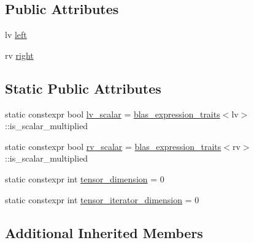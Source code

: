 \subsection*{Public Attributes}
\begin{DoxyCompactItemize}
\item 
lv \hyperlink{structBC_1_1tensors_1_1exprs_1_1Binary__Expression_3_01oper_1_1dot_3_01System__Tag_01_4_00_01lv_00_01rv_01_4_a17d0cd14365a29c0aa10cba3f9d57c04}{left}
\item 
rv \hyperlink{structBC_1_1tensors_1_1exprs_1_1Binary__Expression_3_01oper_1_1dot_3_01System__Tag_01_4_00_01lv_00_01rv_01_4_ac16bea75afa747671af04ba484694a19}{right}
\end{DoxyCompactItemize}
\subsection*{Static Public Attributes}
\begin{DoxyCompactItemize}
\item 
static constexpr bool \hyperlink{structBC_1_1tensors_1_1exprs_1_1Binary__Expression_3_01oper_1_1dot_3_01System__Tag_01_4_00_01lv_00_01rv_01_4_a49e4e40c1204f61b32a0806f9610c91d}{lv\+\_\+scalar} = \hyperlink{structBC_1_1tensors_1_1exprs_1_1blas__expression__traits}{blas\+\_\+expression\+\_\+traits}$<$lv$>$\+::is\+\_\+scalar\+\_\+multiplied
\item 
static constexpr bool \hyperlink{structBC_1_1tensors_1_1exprs_1_1Binary__Expression_3_01oper_1_1dot_3_01System__Tag_01_4_00_01lv_00_01rv_01_4_ad88437990f342c0a97fbe05153f23af1}{rv\+\_\+scalar} = \hyperlink{structBC_1_1tensors_1_1exprs_1_1blas__expression__traits}{blas\+\_\+expression\+\_\+traits}$<$rv$>$\+::is\+\_\+scalar\+\_\+multiplied
\item 
static constexpr int \hyperlink{structBC_1_1tensors_1_1exprs_1_1Binary__Expression_3_01oper_1_1dot_3_01System__Tag_01_4_00_01lv_00_01rv_01_4_a427270424bc3aa0702c8a3bffd77e1c8}{tensor\+\_\+dimension} = 0
\item 
static constexpr int \hyperlink{structBC_1_1tensors_1_1exprs_1_1Binary__Expression_3_01oper_1_1dot_3_01System__Tag_01_4_00_01lv_00_01rv_01_4_a832141f8e846880d4c03292accd383a5}{tensor\+\_\+iterator\+\_\+dimension} = 0
\end{DoxyCompactItemize}
\subsection*{Additional Inherited Members}


